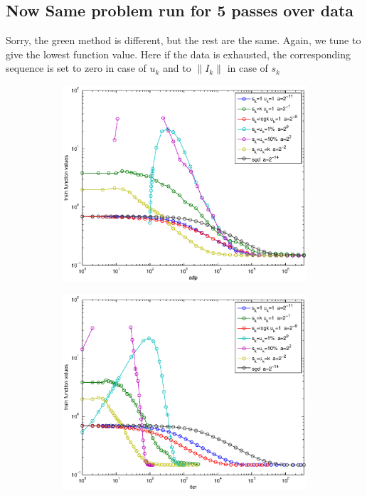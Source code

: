 \documentclass[12pt]{article}
\begin{document}
	\newpage
	
	\subsection{Now Same problem run for 5 passes over data}
	Sorry, the green method is different, but the rest are the same. Again, we tune to give the lowest function value. Here if the data is exhausted, the corresponding sequence is set to zero in case of $u_k$ and to $\|I_k\|$ in case of $s_k$
	
	
	\begin{figure}[H]
	\begin{subfigure}[b]{.5\linewidth}
		        \includegraphics[width=4in]{Figures/16-3-1.eps}
	\end{subfigure}%
	\begin{subfigure}[b]{.5\linewidth}
		        \includegraphics[width=4in]{Figures/16-3-2.eps}
	\end{subfigure}%


\end{figure}
\end{document}
